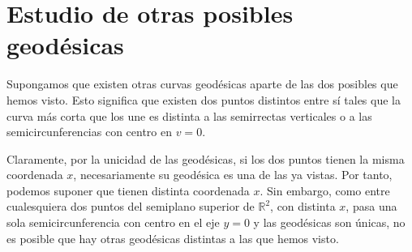 \section{Estudio de otras posibles geodésicas}
Supongamos que existen otras curvas geodésicas aparte de las dos posibles que
hemos visto. Esto significa que existen dos puntos distintos entre sí tales que
la curva más corta que los une es distinta a las semirrectas verticales o  a las
semicircunferencias con centro en $v = 0$.

Claramente, por la unicidad de las geodésicas, si los dos puntos tienen la misma
coordenada $x$, necesariamente su geodésica es una de las ya vistas. Por tanto,
podemos suponer que tienen distinta coordenada $x$. Sin embargo, como entre
cualesquiera dos puntos del semiplano superior de $\mathbb{R}^2$, con distinta
$x$, pasa una sola semicircunferencia con centro en el eje $y = 0$ y las
geodésicas son únicas, no es posible que hay otras geodésicas distintas a las
que hemos visto.
